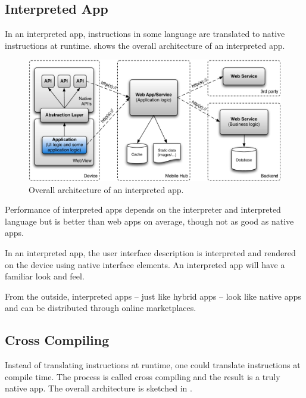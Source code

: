 \subsection{Interpreted App}

In an interpreted app, instructions in some language are translated to native instructions at runtime.  shows the overall architecture of an interpreted app.

\begin{figure}[h!]
    \begin{center}
        \includegraphics[width=\textwidth]{figs/interpreted.pdf}
        \caption{
            Overall architecture of an interpreted app.
        }
        \label{fig:interpreted}
    \end{center}
\end{figure}

Performance of interpreted apps depends on the interpreter and interpreted language but is better than web apps on average, though not as good as native apps. 

In an interpreted app, the user interface description is interpreted and rendered on the device using native interface elements. An interpreted app will have a familiar look and feel.

From the outside, interpreted apps -- just like hybrid apps -- look like native apps and can be distributed through online marketplaces.

\subsection{Cross Compiling}

Instead of translating instructions at runtime, one could translate instructions at compile time. The process is called cross compiling and the result is a truly native app. The overall architecture is sketched in . 

